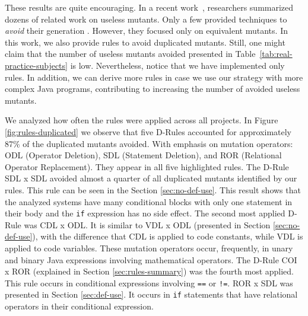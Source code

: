 These results are quite encouraging. 
In a recent work~\cite{KINTIS:2017:1}, researchers summarized dozens of related work on useless mutants. 
Only a few provided techniques to \textit{avoid} their generation \cite{ADAMOPOULOS:2004:1, MADEYISKI:2014:1}. 
However, they focused only on equivalent mutants. 
In this work, we also provide rules to avoid duplicated mutants. 
Still, one might claim that the number of useless mutants avoided presented in Table~\ref{tab:real-practice-subjects} is low. 
Nevertheless, notice that we have implemented only \NumberOfImplementedHeuristics rules. 
In addition, we can derive more rules in case we use our strategy with more complex Java programs, contributing to increasing the number of avoided useless mutants.

We analyzed how often the rules were applied across all projects.
In Figure \ref{fig:rules-duplicated} we observe that five D-Rules accounted for approximately 87\% of the duplicated mutants avoided.
With emphasis on mutation operators: ODL (Operator Deletion), SDL (Statement Deletion), and ROR (Relational Operator Replacement). 
They appear in all five highlighted rules.
The D-Rule SDL x SDL avoided almost a quarter of all duplicated mutants identified by our rules.
This rule can be seen in the Section \ref{sec:no-def-use}.
This result shows that the analyzed systems have many conditional blocks with only one statement in their body and the \texttt{if} expression has no side effect.
The second most applied D-Rule was CDL x ODL.
It is similar to VDL x ODL (presented in Section \ref{sec:no-def-use}), with the difference that CDL is applied to code constants, while VDL is applied to code variables.
These mutation operators occur, frequently, in unary and binary Java expressions involving mathematical operators.
The D-Rule COI x ROR (explained in Section \ref{sec:rules-summary}) was the fourth most applied. 
This rule occurs in conditional expressions involving \texttt{==} or \texttt{!=}.
ROR x SDL was presented in Section \ref{sec:def-use}. 
It occurs in \texttt{if} statements that have relational operators in their conditional expression.

